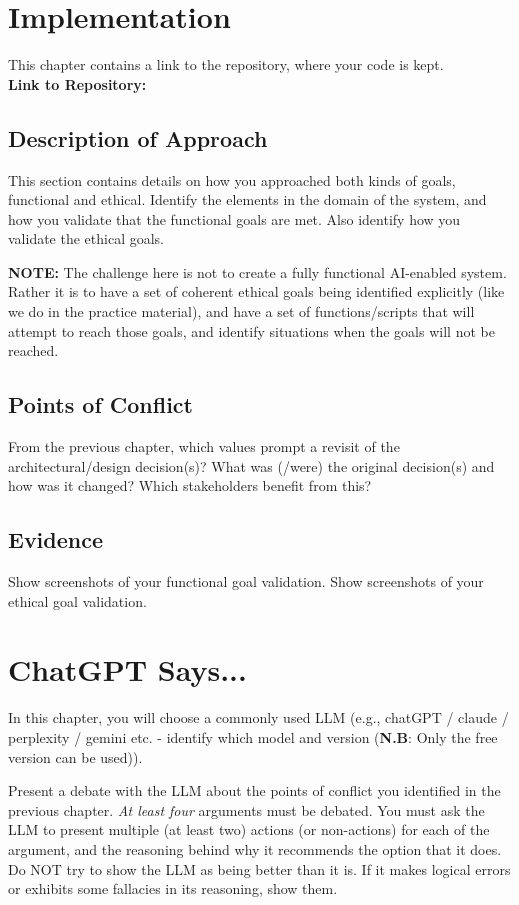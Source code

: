 \documentclass[]
{UCD_CS_41820_Report}
\begin{document}
\chapter{Implementation}
This chapter contains a link to the repository, where your code is kept.\\
\textbf{Link to Repository:} \href{}{} %

\section{Description of Approach}
This section contains details on how you approached both kinds of goals, functional and ethical. Identify the elements in the domain of the system, and how you validate that the functional goals are met. Also identify how you validate the ethical goals.

\textbf{NOTE:} The challenge here is not to create a fully functional AI-enabled system. Rather it is to have a set of coherent ethical goals being identified explicitly (like we do in the practice material), and have a set of functions/scripts that will attempt to reach those goals, and identify situations when the goals will not be reached.

\section{Points of Conflict}
From the previous chapter, which values prompt a revisit of the architectural/design decision(s)? What was (/were) the original decision(s) and how was it changed? Which stakeholders benefit from this?

\section{Evidence}
Show screenshots of your functional goal validation. Show screenshots of your ethical goal validation.



\chapter{ChatGPT Says...}
In this chapter, you will choose a commonly used LLM (e.g., chatGPT / claude / perplexity / gemini etc. - identify which model and version (\textbf{N.B}: Only the free version can be used)).

Present a debate with the LLM about the points of conflict you identified in the previous chapter. \textit{At least four} arguments must be debated. You must ask the LLM to present multiple (at least two) actions (or non-actions) for each of the argument, and the reasoning behind why it recommends the option that it does. Do NOT try to show the LLM as being better than it is. If it makes logical errors or exhibits some fallacies in its reasoning, show them.
\end{document}
